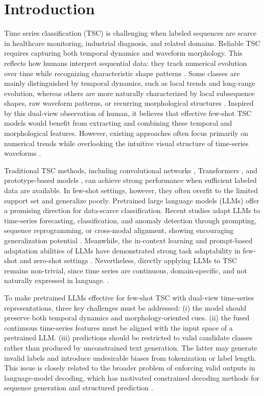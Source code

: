 \documentclass[10pt,journal,compsoc]{IEEEtran}
\begin{document}
\section{Introduction}
Time series classification (TSC) is challenging when labeled sequences are scarce in healthcare monitoring, industrial diagnosis, and related domains\cite{ismail2019deep}.
Reliable TSC requires capturing both temporal dynamics and waveform morphology. This reflects how humans interpret sequential data: they track numerical evolution over time while recognizing characteristic shape patterns \cite{cleveland1984graphical, heer2010tour}. Some classes are mainly distinguished by temporal dynamics, such as local trends and long-range evolution, whereas others are more naturally characterized by local subsequence shapes, raw waveform patterns, or recurring morphological structures \cite{ye2009shapelets,wang2015encoding}. Inspired by this dual-view observation of human, it believes that effective few-shot TSC models would benefit from extracting and combining these temporal and morphological features. However, existing approaches often focus primarily on numerical trends while overlooking the intuitive visual structure of time-series waveforms \cite{dempster2020rocket,tapnet,tang2020dpsn}.

Traditional TSC methods, including convolutional networks \cite{fawaz2020inceptiontime}, Transformers \cite{dyformer}, and prototype-based models \cite{tapnet}, can achieve strong performance when sufficient labeled data are available. In few-shot settings, however, they often overfit to the limited support set and generalize poorly\cite{chen2025llmfew}.
Pretrained large language models (LLMs) offer a promising direction for data-scarce classification. Recent studies adapt LLMs to time-series forecasting, classification, and anomaly detection through prompting, sequence reprogramming, or cross-modal alignment, showing encouraging generalization potential \cite{gruver2023llmtime,zhou2023onefitsall,jin2024timellm,sun2024test}. Meanwhile, the in-context learning and prompt-based adaptation abilities of LLMs have demonstrated strong task adaptability in few-shot and zero-shot settings \cite{brown2020language,dong2024survey}.
Nevertheless, directly applying LLMs to TSC remains non-trivial, since time series are continuous, domain-specific, and not naturally expressed in language. \cite{zheng2025understanding}.

To make pretrained LLMs effective for few-shot TSC with dual-view time-series representations, three key challenges must be addressed: (i) the model should preserve both temporal dynamics and morphology-oriented cues. (ii) the fused continuous time-series features must be aligned with the input space of a pretrained LLM. (iii) predictions should be restricted to valid candidate classes rather than produced by unconstrained text generation. The latter may generate invalid labels and introduce undesirable biases from tokenization or label length. This issue is closely related to the broader problem of enforcing valid outputs in language-model decoding, which has motivated constrained decoding methods for sequence generation and structured prediction \cite{hokamp2017lexically,koo2024automata}.
\end{document}
